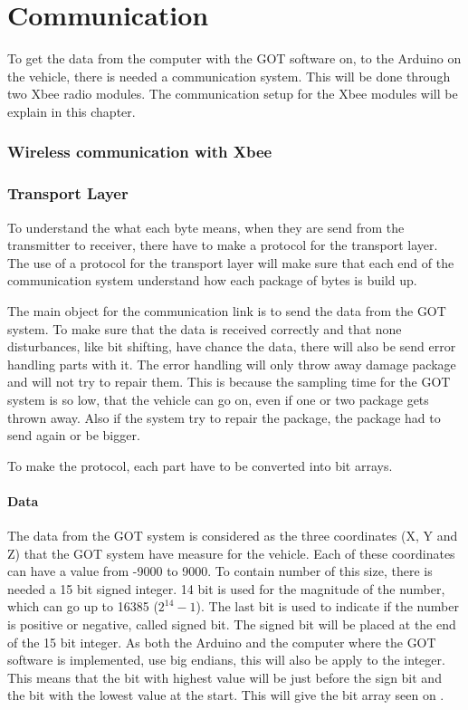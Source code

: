\chapter{Communication}
To get the data from the computer with the GOT software on, to the Arduino on the vehicle, there is needed a communication system. This will be done through two Xbee radio modules. The communication setup for the Xbee modules will be explain in this chapter.

\subsection{Wireless communication with Xbee}

\subsection{Transport Layer}
To understand the what each byte means, when they are send from the transmitter to receiver, there have to make a protocol for the transport layer. The use of a protocol for the transport layer will make sure that each end of the communication system understand how each package of bytes is build up.

The main object for the communication link is to send the data from the GOT system. To make sure that the data is received correctly and that none disturbances, like bit shifting, have chance the data, there will also be send error handling parts with it. The error handling will only throw  away damage package and will not try to repair them. This is because the sampling time for the GOT system is so low, that the vehicle can go on, even if one or two package gets thrown away. Also if the system try to repair the package, the package had to send again or be bigger.

To make the protocol, each part have to be converted into bit arrays.

\subsubsection{Data}
The data from the GOT system is considered as the three coordinates (X, Y and Z) that the GOT system have measure for the vehicle. Each of these coordinates can have a value from -9000 to 9000. To contain number of this size, there is needed a 15 bit signed integer. 14 bit is used for the magnitude of the number, which can go up to 16385 ($2^{14}-1$). The last bit is used to indicate if the number is positive or negative, called signed bit. The signed bit will be placed at the end of the 15 bit integer. As both the Arduino and the computer where the GOT software is implemented, use big endians, this will also be apply to the integer. This means that the bit with highest value will be just before the sign bit and the bit with the lowest value at the start. This will give the bit array seen on .

